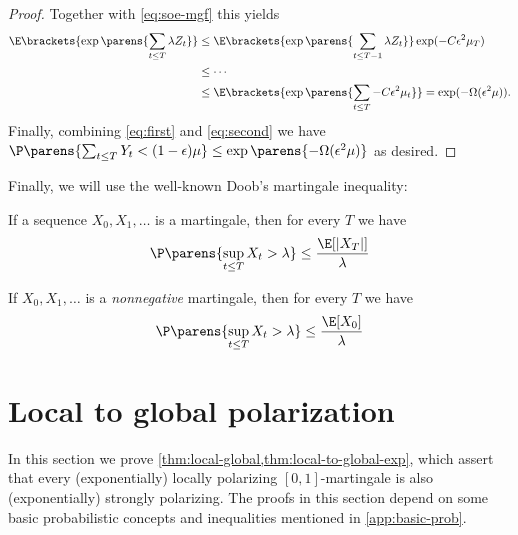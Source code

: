 \documentclass[11pt]{article}
\begin{document}
\begin{proof}
	
	Together with \eqref{eq:soe-mgf} this yields
	\begin{align}
	    \E\brackets{\exp\parens{\sum_{t \leq T} \lambda Z_t}}  & \leq \E\brackets{\exp\parens{\sum_{t \leq T-1} \lambda Z_t}} \exp(- C \epsilon^2 \mu_T) \nonumber \\
	    & \leq \cdots \nonumber \\
	    & \leq \E\brackets{\exp\parens{\sum_{t \leq T} - C \epsilon^2 \mu_t}} = \exp(-\Omega(\epsilon^2 \mu))  \label{eq:second}.
	\end{align}
Finally, combining \eqref{eq:first} and \eqref{eq:second} we have $\P\parens{\sum_{t \leq T} Y_t < (1 - \epsilon) \mu} \leq \exp\parens{-\Omega(\epsilon^2 \mu)}$ as desired.
\end{proof}

Finally, we will use the well-known Doob's martingale inequality:
\begin{lemma} \label{lem:doobs-ineq}
	If a sequence $X_0, X_1, \ldots $ is a martingale, then for every $T$ we have
	\begin{equation*}
		\P\parens{\sup_{t \leq T} X_t > \lambda} \leq \frac{\E [|X_T|]}{\lambda}
	\end{equation*}
\end{lemma}
\begin{corollary}
	\label{cor:doobs}
	If $X_0,  X_1, \ldots$ is a  \emph{nonnegative}  martingale, then for every $T$ we have
	\begin{equation*}
		\P\parens{\sup_{t \leq T} X_t > \lambda} \leq \frac{\E[X_0]}{\lambda}
	\end{equation*}
\end{corollary}


\section{Local to global polarization}
\label{app:loc_to_glob_full}


In this section we prove \cref{thm:local-global,thm:local-to-global-exp}, which assert that every (exponentially) locally polarizing $[0,1]$-martingale is also (exponentially) strongly polarizing. The proofs in this section depend on some basic probabilistic concepts and inequalities mentioned in \cref{app:basic-prob}.
\end{document}
